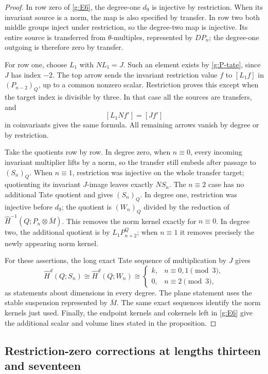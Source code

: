 \documentclass[11pt]{article}
\theoremstyle{definition}
\theoremstyle{remark}
\numberwithin{equation}{section}
\begin{document}
\begin{proof}
In row zero of \eqref{g:E6}, the degree-one $d_9$ is injective
by restriction.  When its invariant source is a norm, the map
is also specified by transfer.  In row two both middle groups
inject under restriction, so the degree-two map is injective.
Its entire source is transferred from $\theta$-multiples,
represented by $DP_n$; the degree-one outgoing is therefore
zero by transfer.

For row one, choose $L_1$ with $NL_1=J$.  Such an element
exists by \eqref{g:P-tate}, since $J$ has index $-2$.
The top arrow sends the invariant restriction value $f$ to
$[L_1f]$ in $(P_{n-2})_Q$, up to a common nonzero scalar.
Restriction proves this except when the target index is
divisible by three.  In that case all the sources are
transfers, and
\[
 [L_1Nf']=[Jf']
\]
in coinvariants gives the same formula.  All remaining arrows
vanish by degree or by restriction.

Take the quotients row by row.  In degree zero, when
$n\equiv0$, every incoming invariant multiplier lifts by a
norm, so the transfer still embeds after passage to
$(S_n)_Q$.  When $n\equiv1$, restriction was injective on
the whole transfer target; quotienting its invariant
$J$-image leaves exactly $NS_n$.  The $n\equiv2$ case
has no additional Tate quotient and gives $(S_n)_Q$.
In degree one, restriction was injective before $d_9$;
the quotient is $(W_n)_Q$ divided by the reduction of
$\widehat H^{-1}(Q;P_n\otimes\overline M)$.  This removes
the norm kernel exactly for $n\equiv0$.  In degree two,
the additional quotient is by $L_1P_{n+2}^Q$; when
$n\equiv1$ it removes precisely the newly appearing norm
kernel.

For these assertions, the long exact Tate sequence of
multiplication by $J$ gives
\[
 \widehat H^d(Q;S_n)\cong\widehat H^d(Q;W_n)
 \cong
 \begin{cases}k,&n\equiv0,1\pmod3,\\0,&n\equiv2\pmod3,
 \end{cases}
\]
as statements about dimensions in every degree.  The plane
statement uses the stable suspension represented by
$\overline M$.  The same exact sequences identify the
norm kernels just used.  Finally, the endpoint kernels
and cokernels left in \eqref{g:E6} give the additional
scalar and volume lines stated in the proposition.
\end{proof}

\subsection{Restriction-zero corrections at lengths thirteen and seventeen}
\end{document}
